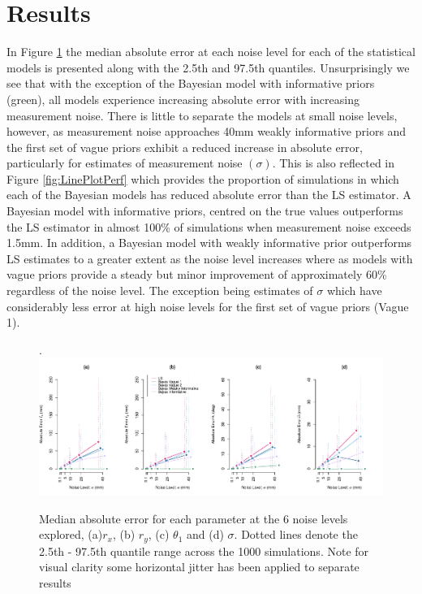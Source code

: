 \documentclass{article}
\begin{document}
\section{Results}
In Figure \ref{fig:LinePlotError} the median absolute error at each noise level for each of the statistical models is presented along with the 2.5th and 97.5th quantiles. Unsurprisingly we see that with the exception of the Bayesian model with informative priors (green), all models experience increasing absolute error with increasing measurement noise.  There is little to separate the models at small noise levels, however, as measurement noise approaches 40\si{\milli\meter}  weakly informative priors and the first set of vague priors exhibit a reduced increase in absolute error, particularly for estimates of measurement noise $(\sigma)$.  This is also reflected in Figure \ref{fig:LinePlotPerf} which provides the proportion of simulations in which each of the Bayesian models has reduced absolute error than the LS estimator.  A Bayesian model with informative priors, centred on the true values outperforms the LS estimator in almost 100\% of simulations when measurement noise exceeds 1.5\si{\milli\meter}.  In addition, a Bayesian model with weakly informative prior outperforms LS estimates to a greater extent as the noise level increases where as models with vague priors provide a steady but minor improvement of approximately 60\% regardless of the noise level.  The exception being estimates of $\sigma$ which have considerably less error at high noise levels for the first set of vague priors (Vague 1).
\begin{figure}.
	\centering
	\includegraphics[width = \linewidth]{./Figures/LinePlot-Error-Legend}
	\caption{Median absolute error for each parameter at the 6 noise levels explored, (a)$r_x$, (b) $r_y$, (c) $\theta_1$ and (d) $\sigma$.  Dotted lines denote the 2.5th - 97.5th quantile range across the 1000 simulations. Note for visual clarity some horizontal jitter has been applied to separate results}
	\label{fig:LinePlotError}
\end{figure}
\end{document}
